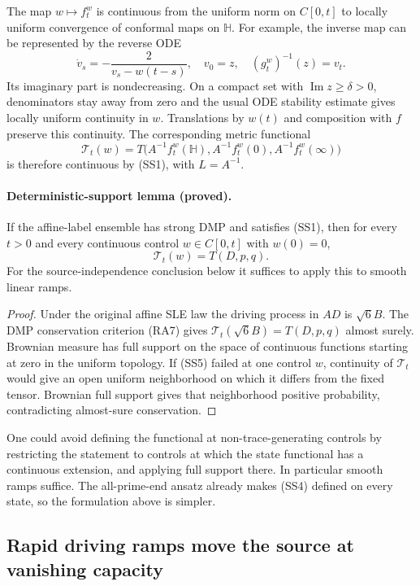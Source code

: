 \documentclass[11pt]{article}
\theoremstyle{definition}\newtheorem{definition}[theorem]{Definition}
\theoremstyle{remark}\newtheorem{remark}[theorem]{Remark}
\begin{document}
The map $w\mapsto f_t^w$ is continuous from the uniform norm on $C[0,t]$
to locally uniform convergence of conformal maps on $\mathbb H$.
For example, the inverse map can be represented by the reverse ODE
\[
 \dot v_s=-\frac{2}{v_s-w(t-s)},\quad v_0=z,\quad
 (g_t^w)^{-1}(z)=v_t.
 \tag{SS3}
\]
Its imaginary part is nondecreasing.  On a compact set with
$\operatorname{Im}z\geq\delta>0$, denominators stay away from zero and the
usual ODE stability estimate gives locally uniform continuity in $w$.
Translations by $w(t)$ and composition with $f$ preserve this continuity.
The corresponding metric functional
\[
 \mathcal T_t(w)=
 T\bigl(A^{-1}f_t^w(\mathbb H),
         A^{-1}f_t^w(0),A^{-1}f_t^w(\infty)\bigr)
 \tag{SS4}
\]
is therefore continuous by (SS1), with $L=A^{-1}$.

\paragraph{Deterministic-support lemma (proved).}
If the affine-label ensemble has strong DMP and satisfies (SS1), then for
every $t>0$ and every continuous control $w\in C[0,t]$ with $w(0)=0$,
\[
 \mathcal T_t(w)=T(D,p,q).
 \tag{SS5}
\]
For the source-independence conclusion below it suffices to apply this to
smooth linear ramps.

\begin{proof}
Under the original affine SLE law the driving process in $AD$ is
$\sqrt6 B$.  The DMP conservation criterion (RA7) gives
$\mathcal T_t(\sqrt6 B)=T(D,p,q)$ almost surely.  Brownian measure has full
support on the space of continuous functions starting at zero in the
uniform topology.  If (SS5) failed at one control $w$, continuity of
$\mathcal T_t$ would give an open uniform neighborhood on which it differs
from the fixed tensor.  Brownian full support gives that neighborhood
positive probability, contradicting almost-sure conservation.
\end{proof}

One could avoid defining the functional at non-trace-generating controls
by restricting the statement to controls at which the state functional has
a continuous extension, and applying full support there.  In particular
smooth ramps suffice.  The all-prime-end ansatz already makes (SS4) defined
on every state, so the formulation above is simpler.

\subsection{Rapid driving ramps move the source at vanishing capacity}
\end{document}
